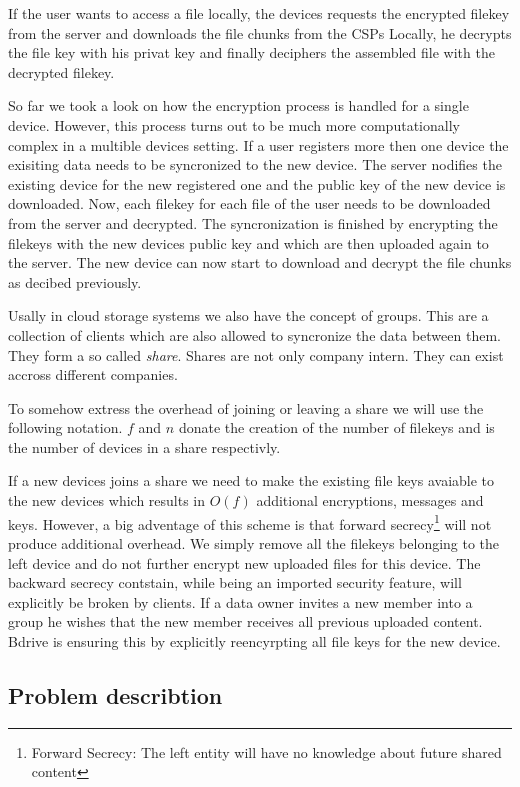 If the user wants to access a file locally, the devices requests the encrypted filekey from the server and downloads the file chunks from the \ac{CSP}s Locally, he decrypts the file key with his privat key and finally deciphers the assembled file with the decrypted filekey. 

So far we took a look on how the encryption process is handled for a single device. However, this process turns out to be much more computationally complex in a multible devices setting.  If a user registers more then one device the exisiting data needs to be syncronized to the new device. The server nodifies the existing device for the new registered one and the public key of the new device is downloaded. Now, each filekey for each file of the user needs to be downloaded from the server and decrypted. The syncronization is finished by encrypting the filekeys with the new devices public key and which are then uploaded again to the server. The new device can now start to download and decrypt the file chunks as decibed previously.

Usally in cloud storage systems we also have the concept of groups. This are a collection of clients which are also allowed to syncronize the data between them. They form a so called \textit{share}. Shares are not only company intern. They can exist accross different companies. 

To somehow extress the overhead of joining or leaving a share we will use the following notation. $f$ and $n$ donate the creation of the number of filekeys and is the number of devices in a share respectivly.

If a new devices joins a share we need to make the existing file keys avaiable to the new devices which results in $O(f)$ additional encryptions, messages and keys. However, a big adventage of this scheme is that forward secrecy\footnote{Forward Secrecy: The left entity will have no knowledge about future shared content} will not produce additional overhead. We simply remove all the filekeys belonging to the left device and do not further encrypt new uploaded files for this device. The backward secrecy contstain, while being an imported security feature, will explicitly be broken by clients. If a data owner invites a new member into a group he wishes that the new member receives all previous uploaded content. Bdrive is ensuring this by explicitly reencyrpting all file keys for the new device. 

\subsection{Problem describtion}

